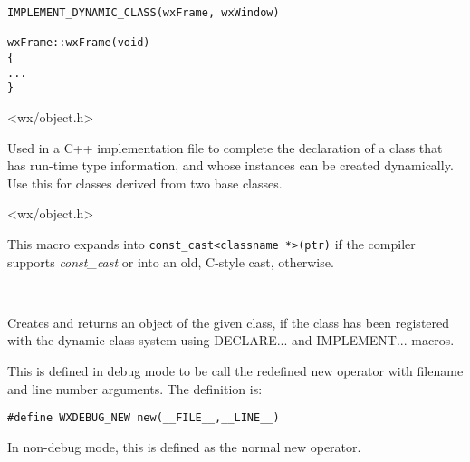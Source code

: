 \begin{verbatim}
IMPLEMENT_DYNAMIC_CLASS(wxFrame, wxWindow)

wxFrame::wxFrame(void)
{
...
}
\end{verbatim}


<wx/object.h>

\label{implementdynamicclass2}


Used in a C++ implementation file to complete the declaration of
a class that has run-time type information, and whose instances
can be created dynamically. Use this for classes derived from two
base classes.


<wx/object.h>

\label{wxconstcast}


This macro expands into {\tt const\_cast<classname *>(ptr)} if the compiler
supports {\it const\_cast} or into an old, C-style cast, otherwise.


\\

\label{wxcreatedynamicobject}


Creates and returns an object of the given class, if the class has been
registered with the dynamic class system using DECLARE... and IMPLEMENT... macros.

\label{debugnew}


This is defined in debug mode to be call the redefined new operator
with filename and line number arguments. The definition is:

\begin{verbatim}
#define WXDEBUG_NEW new(__FILE__,__LINE__)
\end{verbatim}

In non-debug mode, this is defined as the normal new operator.

